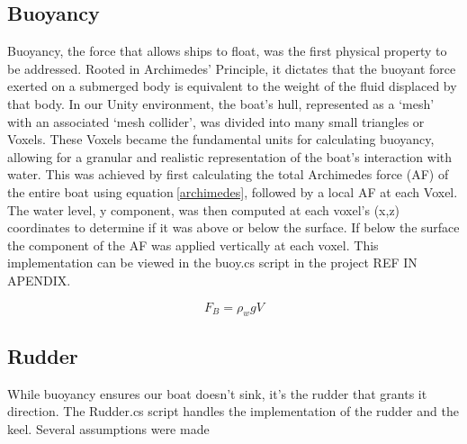 \subsection{Buoyancy}\label{sec:Buoyancy}
Buoyancy, the force that allows ships to float, was the first physical property to be addressed. Rooted in Archimedes' Principle, it dictates that the buoyant force exerted on a submerged body is equivalent to the weight of the fluid displaced by that body. In our Unity environment, the boat's hull, represented as a `mesh' with an associated `mesh collider', was divided into many small triangles or Voxels. These Voxels became the fundamental units for calculating buoyancy, allowing for a granular and realistic representation of the boat's interaction with water. This was achieved by first calculating the total Archimedes force (AF) of the entire boat using equation$~$\ref{archimedes}, followed by a local AF at each Voxel. The water level, y component, was then computed at each voxel's (x,z) coordinates to determine if it was above or below the surface. If below the surface the component of the AF was applied vertically at each voxel. This implementation can be viewed in the buoy.cs script in the project REF IN APENDIX.

\begin{equation}
    F_B = \rho_{w}gV
    \label{archimedes}
\end{equation}


\subsection{Rudder}\label{sec:Rudder}
While buoyancy ensures our boat doesn't sink, it's the rudder that grants it direction. The Rudder.cs script handles the implementation of the rudder and the keel. Several assumptions were made 


 

